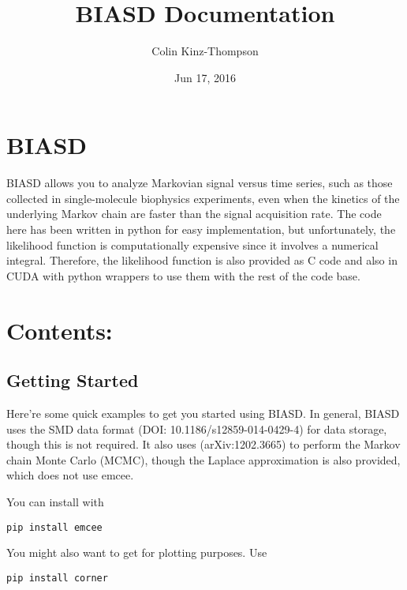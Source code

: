 \documentclass[letterpaper,10pt,english]{sphinxmanual}
\title{BIASD Documentation}
\date{Jun 17, 2016}
\author{Colin Kinz-Thompson}
\begin{document}
\maketitle
\tableofcontents
{}\label{index::doc}



\chapter{BIASD}
\label{index:bayesian-inference-for-the-analysis-of-sub-temporal-resolution-data}\label{index:biasd}
BIASD allows you to analyze Markovian signal versus time series, such as those collected in single-molecule biophysics experiments, even when the kinetics of the underlying Markov chain are faster than the signal acquisition rate. The code here has been written in python for easy implementation, but unfortunately, the likelihood function is computationally expensive since it involves a numerical integral. Therefore, the likelihood function is also provided as C code and also in CUDA with python wrappers to use them with the rest of the code base.


\chapter{Contents:}
\label{index:contents}

\section{Getting Started}
\label{getstarted:getstarted}\label{getstarted:getting-started}\label{getstarted::doc}
Here're some quick examples to get you started using BIASD. In general, BIASD uses the SMD data format (DOI: 10.1186/s12859-014-0429-4) for data storage, though this is not required. It also uses  (arXiv:1202.3665) to perform the Markov chain Monte Carlo (MCMC), though the Laplace approximation is also provided, which does not use emcee.

You can install  with

\begin{Verbatim}[commandchars=\\\{\}]
pip install emcee
\end{Verbatim}

You might also want to get  for plotting purposes. Use

\begin{Verbatim}[commandchars=\\\{\}]
pip install corner
\end{Verbatim}
\end{document}
